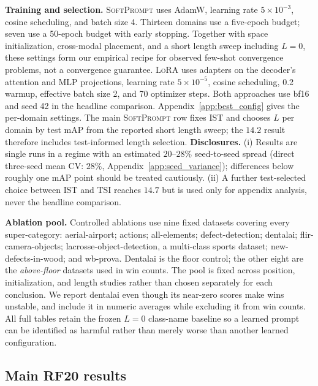 \documentclass{article}
\newcommand{\ours}{\textsc{SoftPrompt}}
\newcommand{\lora}{\textsc{LoRA}}
\begin{document}
\textbf{Training and selection.}
\ours{} uses AdamW, learning rate $5\times10^{-3}$, cosine scheduling, and
batch size 4.
Thirteen domains use a five-epoch budget; seven use a 50-epoch budget with
early stopping.
Together with space initialization, cross-modal placement, and a short length
sweep including $L=0$, these settings form our empirical recipe for observed
few-shot convergence problems, not a convergence guarantee.
\lora{} uses adapters on the decoder's attention and MLP projections, learning
rate $5\times10^{-5}$, cosine scheduling, 0.2 warmup, effective batch size 2,
and 70 optimizer steps. Both approaches use bf16 and seed 42 in the headline
comparison.
Appendix~\ref{app:best_config} gives the per-domain settings.
The main \ours{} row fixes IST and chooses $L$ per domain by test mAP from the
reported short length sweep; the $14.2$ result therefore includes
test-informed length selection.
\textbf{Disclosures.}
(i) Results are single runs in a regime with an estimated $20$--$28\%$
seed-to-seed spread (direct three-seed mean CV: $28\%$,
Appendix~\ref{app:seed_variance}); differences below roughly one mAP point
should be treated cautiously.
(ii) A further test-selected choice between IST and TSI reaches $14.7$ but is
used only for appendix analysis, never the headline comparison.

\textbf{Ablation pool.}
Controlled ablations use nine fixed datasets covering every super-category:
aerial-airport; actions; all-elements; defect-detection; dentalai;
flir-camera-objects; lacrosse-object-detection, a multi-class sports dataset;
new-defects-in-wood; and wb-prova.
Dentalai is the floor control; the other eight are the \emph{above-floor}
datasets used in win counts.
The pool is fixed across position, initialization, and length studies rather
than chosen separately for each conclusion. We report dentalai even though its
near-zero scores make wins unstable, and include it in numeric averages while
excluding it from win counts. All full tables retain the frozen $L=0$
class-name baseline so a learned prompt can be identified as harmful rather
than merely worse than another learned configuration.

\subsection{Main RF20 results}
\label{subsec:main}
\end{document}
